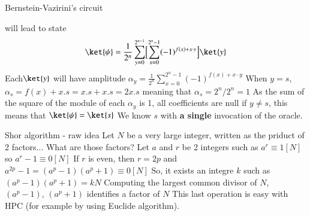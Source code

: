 \begin{frame}{Bernstein-Vazirini's circuit}
\begin{center}
\end{center}
will lead to state
\begin{equation*}
   \ket{\psi} =  \frac{1}{2^n} \sum_{y=0}^{2^{n-1}} \Bigl[\sum_{x=0}^{2^n -1} (-1)^{f(x)+x\cdot y}\Bigr]\ket{y} 
\end{equation*}
Each$\ket{y}$ will have amplitude $\alpha_y = \frac{1}{2^n} \sum_{x=0}^{2^n -1} (-1)^{f(x)+x\cdot y} $ \newline
When $y=s$, $\alpha_s = f(x)+x.s = x.s + x.s = 2x.s$ meaning that $\alpha_s = 2^n / 2^n = 1$ \newline
As the sum of the square of the module of each $\alpha_y$ is 1, all coefficients are null if $y \neq s$, this means 
that $\ket{\psi}= \ket{s}$ 
\newline
We know $s$ with \textbf{a single} invocation of the oracle. 
\end{frame}

\begin{frame}{Shor algorithm - raw idea}
Let $N$ be a very large integer, written as the priduct of 2 factors... What are those factors?\newline \newline
Let $a$ and $r$ be 2 integers such as  $a^r \equiv 1 [N]$ so $a^r -1 \equiv 0 [N]$ \newline \newline
If $r$ is even, then $r = 2p$ and  $a^{2p} - 1 = (a^p-1)(a^p+1) \equiv 0 [N]$ \newline \newline
So, it exists an integre $k$ such as $(a^p-1)(a^p+1)=kN$ \newline \newline
Computing the largest common divisor of $N$, $(a^p-1)$, $(a^p+1)$ identifies a factor of $N$ \newline \newline
This last operation is easy with HPC (for example by using Euclide algorithm). 
\end{frame}

